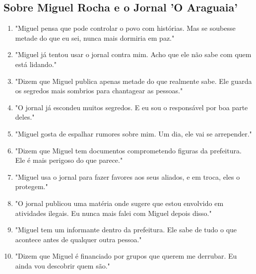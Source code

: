 \subsection*{Sobre Miguel Rocha e o Jornal 'O Araguaia'}
\begin{enumerate}
    \item "Miguel pensa que pode controlar o povo com histórias. Mas se soubesse metade do que eu sei, nunca mais dormiria em paz."
    \item "Miguel já tentou usar o jornal contra mim. Acho que ele não sabe com quem está lidando."
    \item "Dizem que Miguel publica apenas metade do que realmente sabe. Ele guarda os segredos mais sombrios para chantagear as pessoas."
    \item "O jornal já escondeu muitos segredos. E eu sou o responsável por boa parte deles."
    \item "Miguel gosta de espalhar rumores sobre mim. Um dia, ele vai se arrepender."
    \item "Dizem que Miguel tem documentos comprometendo figuras da prefeitura. Ele é mais perigoso do que parece."
    \item "Miguel usa o jornal para fazer favores aos seus aliados, e em troca, eles o protegem."
    \item "O jornal publicou uma matéria onde sugere que estou envolvido em atividades ilegais. Eu nunca mais falei com Miguel depois disso."
    \item "Miguel tem um informante dentro da prefeitura. Ele sabe de tudo o que acontece antes de qualquer outra pessoa."
    \item "Dizem que Miguel é financiado por grupos que querem me derrubar. Eu ainda vou descobrir quem são."
\end{enumerate}

